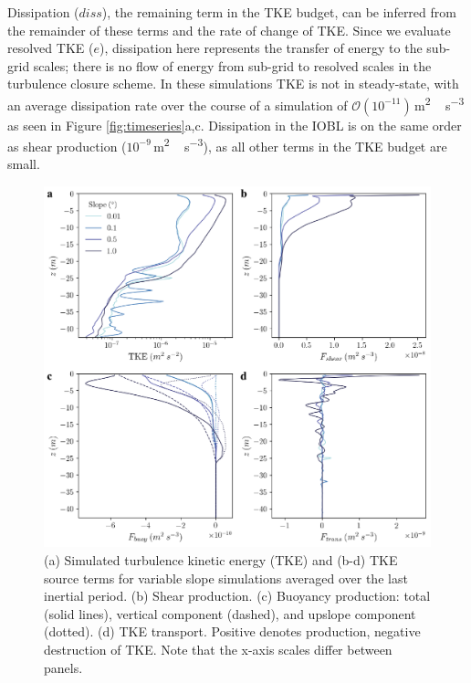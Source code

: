 \documentclass[tc, manuscript]{copernicus}
\begin{document}
Dissipation ($diss$), the remaining term in the TKE budget, can be inferred from the remainder of these terms and the rate of change of TKE. Since we evaluate resolved TKE ($e$), dissipation here represents the transfer of energy to the sub-grid scales; there is no flow of energy from sub-grid to resolved scales in the turbulence closure scheme. In these simulations TKE is not in steady-state, with an average  dissipation rate over the course of a simulation of $\mathcal{O}(10^{-11})$\,\unit{m^2\,s^{-3}} as seen in Figure \ref{fig:timeseries}a,c. Dissipation in the IOBL is on the same order as shear production ($10^{-9}$\,\unit{m^2\,s^{-3}}), as all other terms in the TKE budget are small. 

\begin{figure}[t]
\includegraphics[width=12cm]{fig4.pdf}
\caption{(a) Simulated turbulence kinetic energy (TKE) and (b-d) TKE source terms for variable slope simulations averaged over the last inertial period. (b) Shear production. (c) Buoyancy production: total (solid lines), vertical component (dashed), and upslope component (dotted). (d) TKE transport. Positive denotes production, negative destruction of TKE. Note that the x-axis scales differ between panels.}
\label{fig:tke_budget}
\end{figure}
\end{document}
